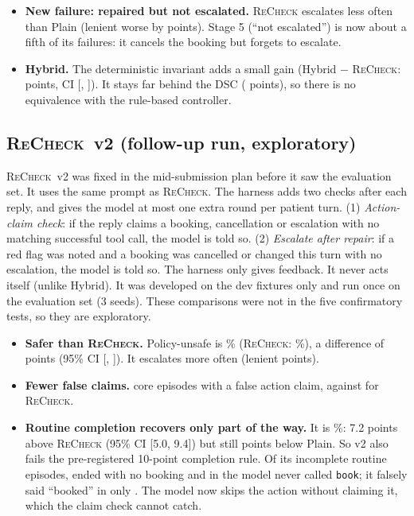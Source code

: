 \documentclass[10pt]{article}
\newcommand{\recheck}{\textsc{ReCheck}}
\begin{document}
\begin{itemize}
  The longer procedure makes the 7B model skip real actions while claiming success.
\item \textbf{New failure: repaired but not escalated.} \recheck{} escalates less often than Plain (lenient worse by \recheckVsPlainLenient{} points). Stage 5 (``not escalated'') is now about a fifth of its failures: it cancels the booking but forgets to escalate.
\item \textbf{Hybrid.} The deterministic invariant adds a small gain (Hybrid $-$ \recheck{}: \hybridVsRecheckPolicy{} points, CI [\hybridVsRecheckPolicyLo, \hybridVsRecheckPolicyHi]). It stays far behind the DSC (\hybridVsDscPolicy{} points), so there is no equivalence with the rule-based controller.
\end{itemize}

\subsection{\recheck{}~v2 (follow-up run, exploratory)}\label{sec:v2}
\recheck{}~v2 was fixed in the mid-submission plan before it saw the evaluation set. It uses the same prompt as \recheck{}. The harness adds two checks after each reply, and gives the model at most one extra round per patient turn. (1) \emph{Action-claim check}: if the reply claims a booking, cancellation or escalation with no matching successful tool call, the model is told so. (2) \emph{Escalate after repair}: if a red flag was noted and a booking was cancelled or changed this turn with no escalation, the model is told so. The harness only gives feedback. It never acts itself (unlike Hybrid). It was developed on the dev fixtures only and run once on the evaluation set (3 seeds). These comparisons were not in the five confirmatory tests, so they are exploratory.
\begin{itemize}
\item \textbf{Safer than \recheck{}.} Policy-unsafe is \recheckvtwoPolicy\% (\recheck{}: \recheckPolicy\%), a difference of \recheckvtwoVsRecheckPolicy{} points (95\% CI [\recheckvtwoVsRecheckPolicyLo, \recheckvtwoVsRecheckPolicyHi]). It escalates more often (lenient \recheckvtwoVsRecheckLenient{} points).
\item \textbf{Fewer false claims.} \recheckvtwoFalseClaim{} core episodes with a false action claim, against \recheckFalseClaim{} for \recheck{}.
\item \textbf{Routine completion recovers only part of the way.} It is \recheckvtwoCompl\%: 7.2 points above \recheck{} (95\% CI [5.0, 9.4]) but still \recheckvtwoComplDrop{} points below Plain. So v2 also fails the pre-registered 10-point completion rule. Of its \recheckvtwoRoutineFail{} incomplete routine episodes, \recheckvtwoNoAction{} ended with no booking and in \recheckvtwoNoBook{} the model never called \texttt{book}; it falsely said ``booked'' in only \recheckvtwoFalseBook{}. The model now skips the action without claiming it, which the claim check cannot catch.
\end{itemize}
\end{document}
